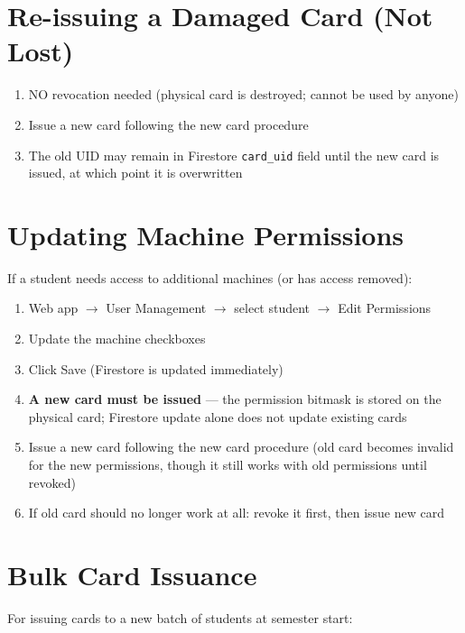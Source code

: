 \section{Re-issuing a Damaged Card (Not Lost)}

\begin{enumerate}[leftmargin=1.5em]
    \item NO revocation needed (physical card is destroyed; cannot be used by anyone)
    \item Issue a new card following the new card procedure
    \item The old UID may remain in Firestore \texttt{card\_uid} field until the new card is issued, at which point it is overwritten
\end{enumerate}

\section{Updating Machine Permissions}

If a student needs access to additional machines (or has access removed):

\begin{enumerate}[leftmargin=1.5em]
    \item Web app $\rightarrow$ User Management $\rightarrow$ select student $\rightarrow$ Edit Permissions
    \item Update the machine checkboxes
    \item Click Save (Firestore is updated immediately)
    \item \textbf{A new card must be issued} --- the permission bitmask is stored on the physical card; Firestore update alone does not update existing cards
    \item Issue a new card following the new card procedure (old card becomes invalid for the new permissions, though it still works with old permissions until revoked)
    \item If old card should no longer work at all: revoke it first, then issue new card
\end{enumerate}

\section{Bulk Card Issuance}

For issuing cards to a new batch of students at semester start:

